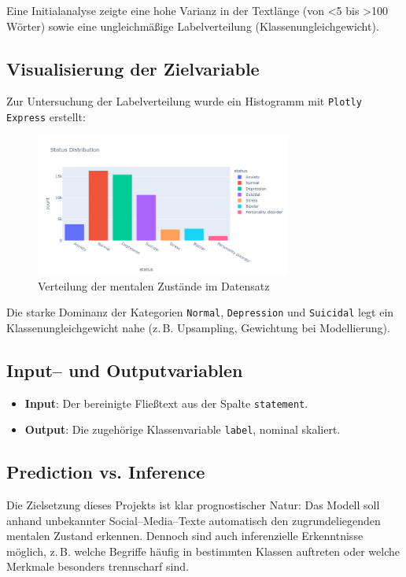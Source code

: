 Eine Initialanalyse zeigte eine hohe Varianz in der Textlänge (von <5 bis >100 Wörter) sowie eine ungleichmäßige Labelverteilung (Klassenungleichgewicht). 

\subsection{Visualisierung der Zielvariable}
Zur Untersuchung der Labelverteilung wurde ein Histogramm mit \texttt{Plotly Express} erstellt:

\begin{figure}[h]
    \centering
    \includegraphics[width=0.75\textwidth]{images/class_distribution.png}
    \caption{Verteilung der mentalen Zustände im Datensatz}
    \label{fig:classdist}
\end{figure}

Die starke Dominanz der Kategorien \texttt{Normal}, \texttt{Depression} und \texttt{Suicidal} legt ein Klassenungleichgewicht nahe (z.\,B. Upsampling, Gewichtung bei Modellierung).


\subsection{Input– und Outputvariablen}
\begin{itemize}
    \item \textbf{Input}: Der bereinigte Fließtext aus der Spalte \texttt{statement}.
    \item \textbf{Output}: Die zugehörige Klassenvariable \texttt{label}, nominal skaliert.
\end{itemize}

\subsection{Prediction vs. Inference}
Die Zielsetzung dieses Projekts ist klar prognostischer Natur: Das Modell soll anhand unbekannter Social–Media–Texte automatisch den zugrundeliegenden mentalen Zustand erkennen. Dennoch sind auch inferenzielle Erkenntnisse möglich, z.\,B. welche Begriffe häufig in bestimmten Klassen auftreten oder welche Merkmale besonders trennscharf sind.

